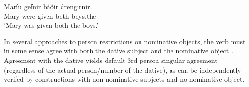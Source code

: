 \documentclass[output=paper,colorlinks,citecolor=brown,
]{langscibook}
\begin{document}
\ea \label{woodgive}
\ea[]%
{
    \gll Maríu  gefnir báðir drengirnir. \\
        Mary\dat{} were given both boys.the\nom{} \\
    \glt `Mary was given both the boys.'
}
\z
{} %
\z

\ea \label{woodboree}
    \z
\z
In several approaches to person restrictions on nominative objects, the verb must in some sense agree with both the dative subject and the nominative object  \citep{Boeckx:2000kf,Schutze:2003mh,Koopman:2006zp,SigurTHsson:2008dm,Ussery:2009jd}. Agreement with the dative yields default 3rd person singular agreement (regardless of the actual person/number of the dative), as can be independently verifed by constructions with non-nominative subjects and no nominative object. 
\end{document}
